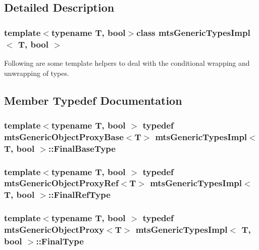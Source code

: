 \subsection{Detailed Description}
\subsubsection*{template$<$typename T, bool$>$class mts\+Generic\+Types\+Impl$<$ T, bool $>$}

Following are some template helpers to deal with the conditional wrapping and unwrapping of types. 

\subsection{Member Typedef Documentation}
\hypertarget{classmts_generic_types_impl_a7997b5c3162967dd9f29b33ef5f1858a}{}
\subsubsection[{Final\+Base\+Type}]{\setlength{\rightskip}{0pt plus 5cm}template$<$typename T, bool $>$ typedef {\bf mts\+Generic\+Object\+Proxy\+Base}$<$T$>$ {\bf mts\+Generic\+Types\+Impl}$<$ T, bool $>$\+::{\bf Final\+Base\+Type}}\label{classmts_generic_types_impl_a7997b5c3162967dd9f29b33ef5f1858a}
\hypertarget{classmts_generic_types_impl_a9f668541e03e4b56b77f94fa09ffbe96}{}
\subsubsection[{Final\+Ref\+Type}]{\setlength{\rightskip}{0pt plus 5cm}template$<$typename T, bool $>$ typedef {\bf mts\+Generic\+Object\+Proxy\+Ref}$<$T$>$ {\bf mts\+Generic\+Types\+Impl}$<$ T, bool $>$\+::{\bf Final\+Ref\+Type}}\label{classmts_generic_types_impl_a9f668541e03e4b56b77f94fa09ffbe96}
\hypertarget{classmts_generic_types_impl_ad04e0f563e98adbcac5647ea821f4100}{}
\subsubsection[{Final\+Type}]{\setlength{\rightskip}{0pt plus 5cm}template$<$typename T, bool $>$ typedef {\bf mts\+Generic\+Object\+Proxy}$<$T$>$ {\bf mts\+Generic\+Types\+Impl}$<$ T, bool $>$\+::{\bf Final\+Type}}\label{classmts_generic_types_impl_ad04e0f563e98adbcac5647ea821f4100}


